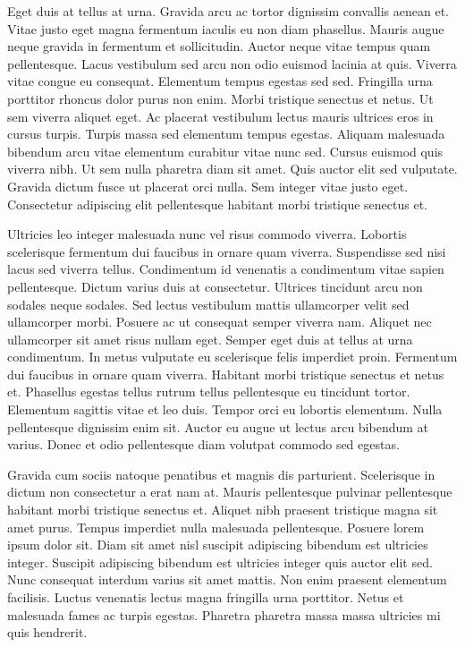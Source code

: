 \documentclass[11pt,a4paper]{article}
\begin{document}
Eget duis at tellus at urna. Gravida arcu ac tortor dignissim convallis aenean et. Vitae justo eget magna fermentum iaculis eu non diam phasellus. Mauris augue neque gravida in fermentum et sollicitudin. Auctor neque vitae tempus quam pellentesque. Lacus vestibulum sed arcu non odio euismod lacinia at quis. Viverra vitae congue eu consequat. Elementum tempus egestas sed sed. Fringilla urna porttitor rhoncus dolor purus non enim. Morbi tristique senectus et netus. Ut sem viverra aliquet eget. Ac placerat vestibulum lectus mauris ultrices eros in cursus turpis. Turpis massa sed elementum tempus egestas. Aliquam malesuada bibendum arcu vitae elementum curabitur vitae nunc sed. Cursus euismod quis viverra nibh. Ut sem nulla pharetra diam sit amet. Quis auctor elit sed vulputate. Gravida dictum fusce ut placerat orci nulla. Sem integer vitae justo eget. Consectetur adipiscing elit pellentesque habitant morbi tristique senectus et.

Ultricies leo integer malesuada nunc vel risus commodo viverra. Lobortis scelerisque fermentum dui faucibus in ornare quam viverra. Suspendisse sed nisi lacus sed viverra tellus. Condimentum id venenatis a condimentum vitae sapien pellentesque. Dictum varius duis at consectetur. Ultrices tincidunt arcu non sodales neque sodales. Sed lectus vestibulum mattis ullamcorper velit sed ullamcorper morbi. Posuere ac ut consequat semper viverra nam. Aliquet nec ullamcorper sit amet risus nullam eget. Semper eget duis at tellus at urna condimentum. In metus vulputate eu scelerisque felis imperdiet proin. Fermentum dui faucibus in ornare quam viverra. Habitant morbi tristique senectus et netus et. Phasellus egestas tellus rutrum tellus pellentesque eu tincidunt tortor. Elementum sagittis vitae et leo duis. Tempor orci eu lobortis elementum. Nulla pellentesque dignissim enim sit. Auctor eu augue ut lectus arcu bibendum at varius. Donec et odio pellentesque diam volutpat commodo sed egestas.

Gravida cum sociis natoque penatibus et magnis dis parturient. Scelerisque in dictum non consectetur a erat nam at. Mauris pellentesque pulvinar pellentesque habitant morbi tristique senectus et. Aliquet nibh praesent tristique magna sit amet purus. Tempus imperdiet nulla malesuada pellentesque. Posuere lorem ipsum dolor sit. Diam sit amet nisl suscipit adipiscing bibendum est ultricies integer. Suscipit adipiscing bibendum est ultricies integer quis auctor elit sed. Nunc consequat interdum varius sit amet mattis. Non enim praesent elementum facilisis. Luctus venenatis lectus magna fringilla urna porttitor. Netus et malesuada fames ac turpis egestas. Pharetra pharetra massa massa ultricies mi quis hendrerit.
\end{document}
